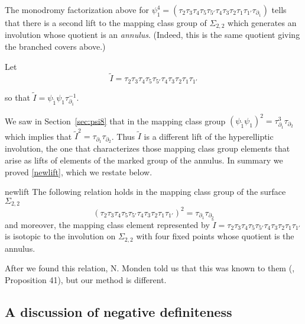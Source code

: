 \documentclass[11pt,letterpaper,reqno]{amsart}
\theoremstyle{remark}
\begin{document}
The monodromy factorization above for $\psi_1^4 = (\tau_2 \tau_3 \tau_4 \tau_5 \tau_{5'} \tau_4 \tau_3 \tau_2 \tau_1 \tau_{1'} \tau_{\partial_1})$ tells that there is a second lift to the mapping class group of $\Sigma_{2,2}$ which generates an involution whose quotient is an \emph{annulus}. (Indeed, this is the same quotient giving the branched covers above.)

Let 
\[ \tilde{I} = \tau_2 \tau_3 \tau_4 \tau_5 \tau_{5'} \tau_4 \tau_3 \tau_2 \tau_1\tau_{1'}\]

so that $\tilde{I} = \psi_{\tilde{1}} \psi_1 \tau_{\partial_1}^{-1}$.

We saw in Section~\ref{sec:psi8} that in the mapping class group $(\psi_{\tilde{1}} \psi_1)^2 = \tau_{\partial_1}^3 \tau_{\partial_2}$ which implies that $\tilde{I}^2 = \tau_{\partial_1} \tau_{\partial_2}$. Thus $\tilde{I}$ is a different lift of the hyperelliptic involution, the one that characterizes those mapping class group elements that arise as lifts of elements of the marked group of the annulus. In summary we proved \cref{newlift}, which we restate below.

\begin{repprop}{newlift} The following relation holds in the mapping class group of the surface $\Sigma_{2,2}$
\[(\tau_2 \tau_3 \tau_4 \tau_5 \tau_{5'} \tau_4 \tau_3 \tau_2 \tau_1\tau_{1'})^2 = \tau_{\partial_1} \tau_{\partial_2}\]
and moreover, the mapping class element represented by $\tilde{I} = \tau_2 \tau_3 \tau_4 \tau_5 \tau_{5'} \tau_4 \tau_3 \tau_2 \tau_1\tau_{1'}$ is isotopic to the involution on $\Sigma_{2,2}$ with four fixed points whose quotient is the annulus. 
\end{repprop}

After we found this relation, N. Monden told us that this was known to them (\cite{AM}, Proposition 41), but our method is different.

\subsection{A discussion of negative definiteness} \label{sec:negativedef}
\end{document}
